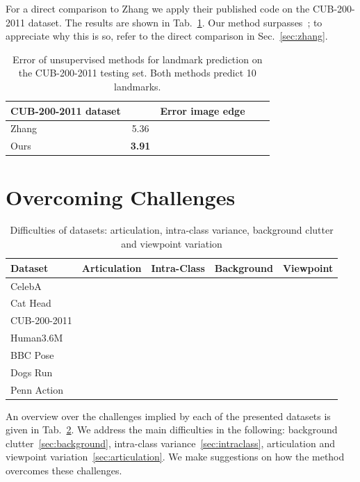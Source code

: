 			For a direct comparison to Zhang \etal \cite{zhang18} we apply their published code on the CUB-200-2011 dataset. The results are shown in Tab.~\ref{tab:birds}. Our method surpasses~\cite{zhang18}; to appreciate why this is so, refer to the direct comparison in Sec.~\ref{sec:zhang}.


			\begin{table}[t]
				\caption{Error of unsupervised methods for landmark prediction on the CUB-200-2011 testing set. Both methods predict 10 landmarks.}
				\label{tab:birds}
				\centering
				\begin{tabular}{l|cccc}
					\hline
					CUB-200-2011 dataset&  & Error \wrt image edge\\
					\hline
					Zhang \etal \cite{zhang18} & 5.36 \\
					Ours  & \textbf{3.91}  \\ \hline
				\end{tabular}
			\end{table}


\section{Overcoming Challenges}\label{sec:challenges}
	\begin{table}[htp]
		\centering
		\caption{Difficulties of datasets: articulation, intra-class variance, background clutter and viewpoint variation}
		\label{tab:challenges}
		\begin{tabular}{l|rrrr}
			\hline
			Dataset &  Articulation & Intra-Class &  Background & Viewpoint \\ \hline
			CelebA &   &  &  &    \\
			Cat Head & &  \checkmark&  &   \\
			CUB-200-2011 & & \checkmark& \checkmark&   \\
			Human3.6M &\checkmark& &  & \checkmark  \\
			BBC Pose &  \checkmark&  & \checkmark&  \\
			Dogs Run & \checkmark& \checkmark& \checkmark&   \\
			Penn Action & \checkmark& \checkmark& \checkmark& \checkmark  \\
			\hline
		\end{tabular}
	\end{table}
	An overview over the challenges implied by each of the presented datasets is given in Tab.~\ref{tab:challenges}. We address the main difficulties in the following: background clutter~\ref{sec:background}, intra-class variance~\ref{sec:intraclass}, articulation and viewpoint variation~\ref{sec:articulation}.
	We make suggestions on how the method overcomes these challenges.

